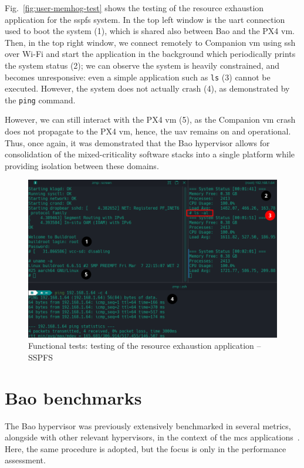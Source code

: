 Fig.~\ref{fig:user-memhog-test} shows the testing of the resource exhaustion
application for the \gls{sspfs} system. 
In the top
left window is the \gls{uart} connection used to boot the system (1), which is
shared also between Bao and the PX4 \gls{vm}. Then, in
the top right window, we connect remotely to Companion \gls{vm} using \gls{ssh} over Wi-Fi and start the
application in the background which periodically prints the system status (2);
we can observe the system is heavily constrained, and becomes unresponsive: even
a simple application such as \lstinline{ls} (3) cannot be executed. However,
the system does not actually crash (4), as demonstrated by the \lstinline{ping}
command. 

However, we can still interact with the PX4 \gls{vm} (5), as the
Companion \gls{vm} crash does not propagate to the PX4 \gls{vm}, hence, the
\gls{uav} remains on and operational. Thus, once again, it was
demonstrated that the Bao hypervisor allows for consolidation of the
mixed-criticality software stacks
into a single platform while providing isolation between these
domains.

\begin{figure}[!hbt]
  \centering
  \includegraphics[width=1.0\textwidth]{./img/png/user-memhog-test-bao-annot} 
  \caption{Functional tests: testing of the resource exhaustion application -- SSPFS}%
  \label{fig:user-memhog-test-bao}
\end{figure}







\section{Bao benchmarks}
\label{sec:bao-benchmarks}
The Bao hypervisor was previously extensively benchmarked in several metrics, alongside with other
relevant hypervisors, in the context of the \gls{mcs}
applications~\cite{martins2023shedding}. Here, the same procedure is adopted,
but the focus is only in the performance assessment.

